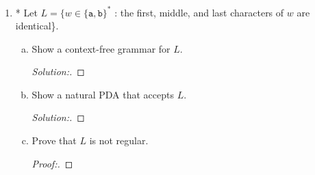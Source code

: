 \documentclass[10pt]{article}
\begin{document}
\begin{enumerate}[1)]
\begin{enumerate}[a)]
\item
Prove that $L$ is not regular.
\begin{proof}[Proof:]
Let $w = a^kbba^k$.  Then $y$ must be $a^p$ for some $p \geq 1$ in the first group of $a$'s.  Now pump out generates a new string $w' = a^{k-p}bba^k$ which is not in $L$.  Therefore by the pumping theorem $L$ is not regular.
\end{proof}
\end{enumerate}



\item
* Let $L = \{w \in \{\texttt{a}, \texttt{b}\}^*$ : the first, middle, and last characters of $w$ are identical\}.
\begin{enumerate}[a)]
\item
Show a context-free grammar for $L$.
\begin{proof}[Solution:]
\end{proof}

\item
Show a natural PDA that accepts $L$.
\begin{proof}[Solution:]
\end{proof}

\item
Prove that $L$ is not regular.
\begin{proof}[Proof:]
\end{proof}
\end{enumerate}
\end{enumerate}
\end{document}
